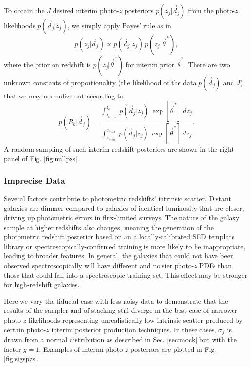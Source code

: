\documentclass[preprint]{aastex}
\begin{document}
To obtain the $J$ desired interim photo-$z$ posteriors $p(z_{j}|\vec{d}_{j})$ 
from the photo-$z$ likelihoods $p(\vec{d}_{j}|z_{j})$, we simply apply Bayes' 
rule as in 
\begin{equation}
\label{eq:likpost}
p(z_{j}|\vec{d}_{j}) \propto p(\vec{d}_{j}|z_{j})\ p(z_{j}|\vec{\theta}^{*}),
\end{equation}
where the prior on redshift is $p(z_{j}|\vec{\theta}^{*})$ for interim prior 
$\vec{\theta}^{*}$.  There are two unknown constants of proportionality (the 
likelihood of the data $p(\vec{d}_{j})$ and $J$) that we may normalize out 
according to 
\begin{equation}
\label{eq:norm}
p(B_{k}|\vec{d}_{j}) = \frac{\int_{z_{k-1}}^{z_{k}}\ p(\vec{d}_{j}|z_{j})\ 
\exp[\vec{\theta}^{*}]\ dz_{j}}{\int_{z_{min}}^{z_{max}}\ p(\vec{d}_{j}|z_{j})\ 
\exp[\vec{\theta}^{*}]\ dz_{j}}.
\end{equation}
A random sampling of such interim redshift posteriors are shown in the right 
panel of Fig. \ref{fig:nullpzs}.  

\subsubsection{Imprecise Data}
\label{sec:imprecision}

Several factors contribute to photometric redshifts' intrinsic scatter.  
Distant galaxies are dimmer compared to galaxies of identical luminosity that 
are closer, driving up photometric errors in flux-limited surveys.  The nature 
of the galaxy sample at higher redshifts also changes, meaning the generation 
of the photometric redshift posterior based on an a locally-calibrated SED 
template library or spectroscopically-confirmed training is more likely to be 
inappropriate, leading to broader features.  In general, the galaxies that 
could not have been observed spectroscopically will have different and noisier 
photo-$z$ PDFs than those that could fall into a spectroscopic training set.  
This effect may be stronger for high-redshift galaxies.

Here we vary the fiducial case with less noisy data to demonstrate that the 
results of the sampler and of stacking still diverge in the best case of 
narrower photo-$z$ likelihoods representing unrealistically low intrinsic 
scatter produced by certain photo-$z$ interim posterior production techniques.  
In these cases, $\sigma_{j}$ is drawn from a normal distribution as described 
in Sec. \ref{sec:mock} but with the factor $g=1$.  Examples of interim 
photo-$z$ posteriors are plotted in Fig. \ref{fig:sigspzs}.
\end{document}

